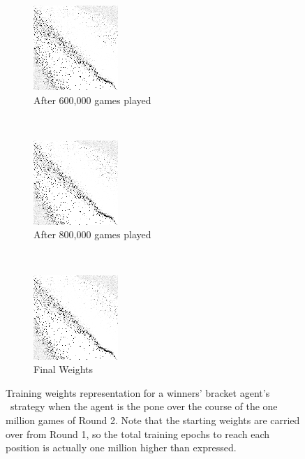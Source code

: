 \begin{figure}
	\begin{subfigure}[t]{0.2\textwidth}
	\includegraphics[width=\stratgraphwidth]{images/findings/round2/flipbook/winner/checkpoint_600000.png}
	\caption{After 600,000 games played}
	\end{subfigure}
	~
	\begin{subfigure}[t]{0.2\textwidth}
	\includegraphics[width=\stratgraphwidth]{images/findings/round2/flipbook/winner/checkpoint_800000.png}
	\caption{After 800,000 games played}
	\end{subfigure}
	~
	\begin{subfigure}[t]{0.2\textwidth}
	\includegraphics[width=\stratgraphwidth]{images/findings/round2/flipbook/winner/checkpoint_999999.png}
	\caption{Final Weights}
	\end{subfigure}

\caption{
	Training weights representation for a winners' bracket agent's \handmaxavg\
	strategy when the agent is the pone
	over the course of the one million games of Round 2.
	Note that the starting weights are carried over from Round 1,
	so the total training epochs to reach each position is actually
	one million higher than expressed.
}
\label{fig:r2-flip-winner}
\end{figure}
